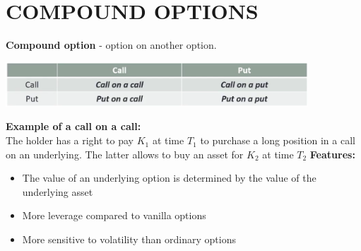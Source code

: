 \documentclass{article}
\begin{document}
\section{COMPOUND OPTIONS}
{\bf Compound option} - option on another option.\\
\begin{center}
\includegraphics[width=0.85\textwidth]{Compound_option.png}\\
\end{center}
{\bf Example of a call on  a call:}\\
The holder has a right to pay $K_1$ at time $T_1$ to purchase a long position in a call on an underlying. The latter allows to buy an asset for $K_2$ at time $T_2$
{\bf Features:}
\begin{itemize}
        \item The value of an underlying option is determined by the value of the underlying asset
        \item More leverage compared to vanilla options
        \item More sensitive to volatility than ordinary options
    \end{itemize}
\end{document}
